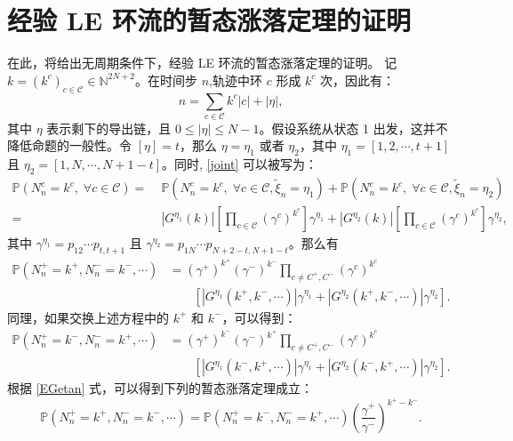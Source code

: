 \section{经验 LE 环流的暂态涨落定理的证明}
在此，将给出无周期条件下，经验 LE 环流的暂态涨落定理的证明。
记 $k=(k^c)_{c\in\mathcal{C}}\in \mathbb{N}^{2N+2}$。在时间步 $n$,轨迹中环 $c$ 形成 $k^c$ 次，因此有：
\begin{equation*}
	n=\sum_{c\in\mathcal{C}}k^c|c|+|\eta|,
\end{equation*}
其中 $\eta$ 表示剩下的导出链，且 $0\le |\eta|\le N-1$。假设系统从状态 1 出发，这并不降低命题的一般性。令 $[\eta]=t$，那么 $\eta=\eta_1$ 或者 $\eta_2$，其中 $\eta_1=[1,2,\cdots,t+1]$ 且 $\eta_2=[1,N,\cdots,N+1-t]$。同时, \eqref{joint} 可以被写为：
\begin{equation}\label{joint2}
	\begin{split}
		\mathbb{P}\left(N^c_n=k^c,\;\forall c\in\mathcal{C}\right)
		=&\;\mathbb{P}\left(N^c_n=k^c,\;\forall c\in\mathcal{C},\tilde{\xi}_n=\eta_1\right)+\mathbb{P}\left(N^c_n=k^c,\;\forall c\in\mathcal{C},\tilde{\xi}_n=\eta_2\right)\\
		=&\;\left|G^{\eta_1}(k)\right|\left[\prod_{c\in\mathcal{C}}\left(\gamma^c\right)^{k^c}\right]\gamma^{\eta_1}+\left|G^{\eta_2}(k)\right|\left[\prod_{c\in\mathcal{C}}\left(\gamma^c\right)^{k^c}\right]\gamma^{\eta_2},
	\end{split}
\end{equation}
其中 $\gamma^{\eta_1}=p_{12}\cdots p_{t,t+1}$ 且 $\gamma^{\eta_2}=p_{1N}\cdots p_{N+2-t,N+1-t}$。那么有
\begin{align*}
	\mathbb{P}\left(N^+_n=k^+,N^-_n=k^-,\cdots\right)
	&= (\gamma^+)^{k^+}(\gamma^-)^{k^-}\prod_{c\neq C^+,C^-}\left(\gamma^c\right)^{k^c}\\
	&\qquad\left[|G^{\eta_1}(k^+,k^-,\cdots)|\gamma^{\eta_1}+|G^{\eta_2}(k^+,k^-,\cdots)|\gamma^{\eta_2}\right].
\end{align*}
同理，如果交换上述方程中的 $k^+$ 和 $k^-$，可以得到：
\begin{align*}
	\mathbb{P}\left(N^+_n=k^-,N^-_n=k^+,\cdots\right)
	&= (\gamma^+)^{k^-}(\gamma^-)^{k^+}\prod_{c\neq C^+,C^-}\left(\gamma^c\right)^{k^c}\\
	&\qquad\left[|G^{\eta_1}(k^-,k^+,\cdots)|\gamma^{\eta_1}+|G^{\eta_2}(k^-,k^+,\cdots)|\gamma^{\eta_2}\right].
\end{align*}
根据 \eqref{EGetan} 式，可以得到下列的暂态涨落定理成立：
\begin{equation*}
	\mathbb{P}\left(N^+_n=k^+,N^-_n=k^-,\cdots\right)=\mathbb{P}\left(N^+_n=k^-,N^-_n=k^+,\cdots\right)\left(\frac{\gamma^+}{\gamma^-}\right)^{k^+-k^-}.
\end{equation*}
